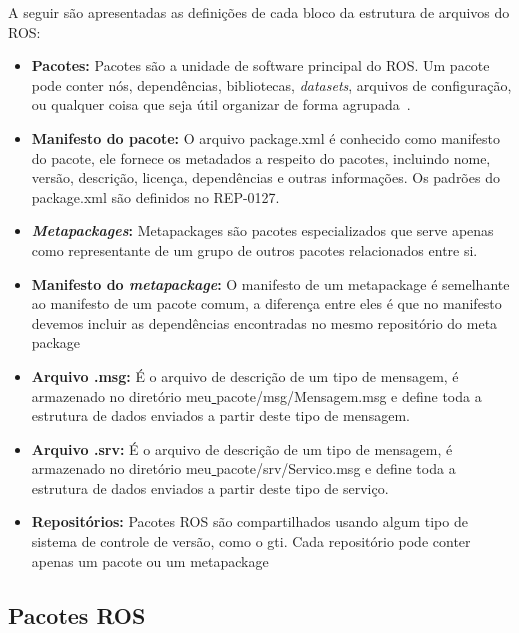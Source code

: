 A seguir são apresentadas as definições de cada bloco da estrutura de arquivos do ROS\@:
\begin{itemize}
    \item \textbf{Pacotes:} Pacotes são a unidade de software principal do ROS\@. Um pacote pode conter nós, dependências, bibliotecas, \textit{datasets}, arquivos de configuração, ou qualquer coisa que seja útil organizar de forma agrupada~\cite{RosPKG}.

    \item \textbf{Manifesto do pacote:} O arquivo package.xml é conhecido como manifesto do pacote, ele fornece os metadados a respeito do pacotes, incluindo nome, versão, descrição, licença, dependências e outras informações. Os padrões do package.xml são definidos no REP-0127.
    
    \item \textbf{\textit{Metapackages}:} Metapackages são pacotes especializados que serve apenas como representante de um grupo de outros pacotes relacionados entre si.
    
    \item \textbf{Manifesto do \textit{metapackage}:} O manifesto de um metapackage é semelhante ao manifesto de um pacote comum, a diferença entre eles é que no manifesto devemos incluir as dependências encontradas no mesmo repositório do meta package
    
    \item \textbf{Arquivo .msg:} É o arquivo de descrição de um tipo de mensagem, é armazenado no diretório meu\underline{ }pacote/msg/Mensagem.msg e define toda a estrutura de dados enviados a partir deste tipo de mensagem.
    
    \item \textbf{Arquivo .srv:} É o arquivo de descrição de um tipo de mensagem, é armazenado no diretório meu\underline{ }pacote/srv/Servico.msg e define toda a estrutura de dados enviados a partir deste tipo de serviço.
    
    \item \textbf{Repositórios:} Pacotes ROS são compartilhados usando algum tipo de sistema de controle de versão, como o gti. Cada repositório pode conter apenas um pacote ou um metapackage 
\end{itemize}


\subsection{Pacotes ROS}

